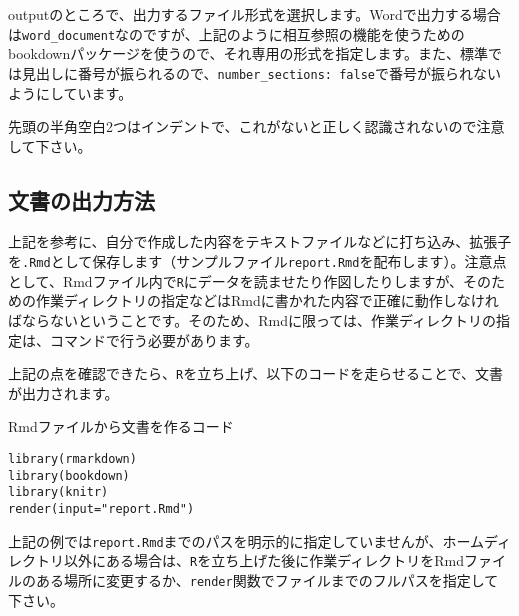 outputのところで、出力するファイル形式を選択します。Wordで出力する場合は\verb|word_document|なのですが、上記のように相互参照の機能を使うためのbookdownパッケージを使うので、それ専用の形式を指定します。また、標準では見出しに番号が振られるので、\verb|number_sections: false|で番号が振られないようにしています。

先頭の半角空白2つはインデントで、これがないと正しく認識されないので注意して下さい。

  \subsection{文書の出力方法}
上記を参考に、自分で作成した内容をテキストファイルなどに打ち込み、拡張子を\verb|.Rmd|として保存します（サンプルファイル\verb|report.Rmd|を配布します）。注意点として、Rmdファイル内で\texttt{R}にデータを読ませたり作図したりしますが、そのための作業ディレクトリの指定などはRmdに書かれた内容で正確に動作しなければならないということです。そのため、Rmdに限っては、作業ディレクトリの指定は、コマンドで行う必要があります。

上記の点を確認できたら、\verb|R|を立ち上げ、以下のコードを走らせることで、文書が出力されます。
\begin{itembox}[l]{Rmdファイルから文書を作るコード}
\begin{verbatim}
library(rmarkdown)
library(bookdown)
library(knitr)
render(input="report.Rmd")
\end{verbatim}
\end{itembox}

上記の例では\verb|report.Rmd|までのパスを明示的に指定していませんが、ホームディレクトリ以外にある場合は、\verb|R|を立ち上げた後に作業ディレクトリをRmdファイルのある場所に変更するか、\texttt{render}関数でファイルまでのフルパスを指定して下さい。

